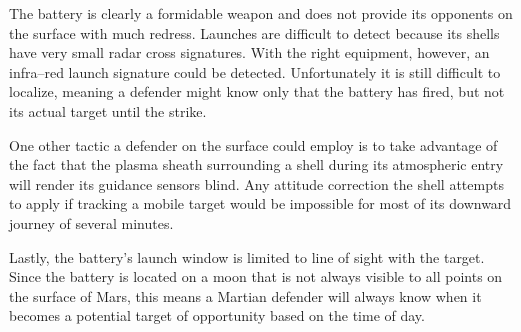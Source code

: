The battery is clearly a formidable weapon and does not provide its opponents on the surface with much redress. Launches are difficult to detect because its shells have very small radar cross signatures. With the right equipment, however, an infra--red launch signature could be detected. Unfortunately it is still difficult to localize, meaning a defender might know only that the battery has fired, but not its actual target until the strike. 

One other tactic a defender on the surface could employ is to take advantage of the fact that the plasma sheath surrounding a shell during its atmospheric entry will render its guidance sensors blind. Any attitude correction the shell attempts to apply if tracking a mobile target would be impossible for most of its downward journey of several minutes.

Lastly, the battery's launch window is limited to line of sight with the target. Since the battery is located on a moon that is not always visible to all points on the surface of Mars, this means a Martian defender will always know when it becomes a potential target of opportunity based on the time of day.

